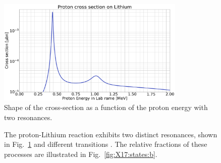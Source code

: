 \begin{refsection}
        \begin{figure}
            \centering
            \includegraphics[width = 0.8\textwidth]{Figures/X17/pLi_crossection.png}
            \caption{Shape of the cross-section as a function of the proton energy \cite{X17:crossections} with two resonances.}
            \label{fig:X17:resonance}
        \end{figure}
        
        \begin{figure}
            \centering
            \hfill
            \caption[Energy levels and transitions of ]{The proton-Lithium reaction exhibits two distinct resonances, shown in Fig.~\ref{fig:X17:resonance} \cite{X17:crossections} and different transitions \cite{X17:Elevels:2004}. The relative fractions of these processes are illustrated in Fig.~\ref{fig:X17:states:b}.}
            \label{fig:X17:states}
        \end{figure}


\end{refsection}
